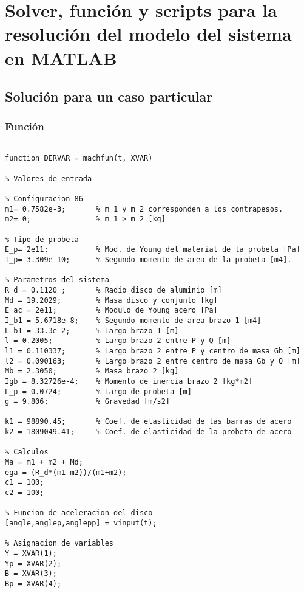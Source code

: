 %
\chapter{Solver, función y scripts para la resolución del modelo del sistema en MATLAB}
\label{ch:anexo_c}

\section{Solución para un caso particular}
\label{sec:sol_part}

\subsection{Función}
\label{sec:fun_part}

\begin{lstlisting}

function DERVAR = machfun(t, XVAR)

% Valores de entrada

% Configuracion 86
m1= 0.7582e-3;       % m_1 y m_2 corresponden a los contrapesos.
m2= 0;               % m_1 > m_2 [kg]

% Tipo de probeta
E_p= 2e11;           % Mod. de Young del material de la probeta [Pa]
I_p= 3.309e-10;      % Segundo momento de area de la probeta [m4].

% Parametros del sistema
R_d = 0.1120 ;       % Radio disco de aluminio [m]
Md = 19.2029;        % Masa disco y conjunto [kg]
E_ac = 2e11;         % Modulo de Young acero [Pa]
I_b1 = 5.6718e-8;    % Segundo momento de area brazo 1 [m4]
L_b1 = 33.3e-2;      % Largo brazo 1 [m]
l = 0.2005;          % Largo brazo 2 entre P y Q [m]
l1 = 0.110337;       % Largo brazo 2 entre P y centro de masa Gb [m]
l2 = 0.090163;       % Largo brazo 2 entre centro de masa Gb y Q [m]
Mb = 2.3050;         % Masa brazo 2 [kg]
Igb = 8.32726e-4;    % Momento de inercia brazo 2 [kg*m2]
L_p = 0.0724;        % Largo de probeta [m]
g = 9.806;           % Gravedad [m/s2]

k1 = 98890.45;       % Coef. de elasticidad de las barras de acero
k2 = 1809049.41;     % Coef. de elasticidad de la probeta de acero

% Calculos
Ma = m1 + m2 + Md;
ega = (R_d*(m1-m2))/(m1+m2);
c1 = 100;
c2 = 100;

% Funcion de aceleracion del disco
[angle,anglep,anglepp] = vinput(t);

% Asignacion de variables
Y = XVAR(1);
Yp = XVAR(2);
B = XVAR(3);
Bp = XVAR(4);


\end{lstlisting}
